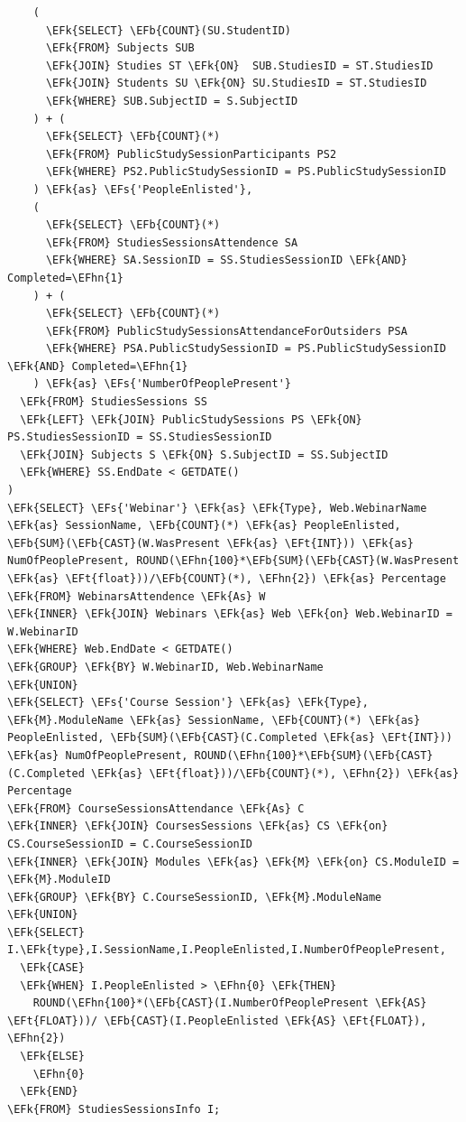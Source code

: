 \documentclass[11pt]{article}
\newcommand{\EFs}[1]{\textcolor{EFs}{#1}} %
\newcommand{\EFk}[1]{\textcolor{EFk}{\textbf{#1}}} %
\newcommand{\EFb}[1]{\textcolor{EFb}{\textbf{#1}}} %
\newcommand{\EFt}[1]{\textcolor{EFt}{\textbf{#1}}} %
\newcommand{\EFhn}[1]{\textcolor{EFhn}{#1}} %
\begin{document}
\begin{Code}
\begin{Verbatim}
    (
      \EFk{SELECT} \EFb{COUNT}(SU.StudentID)
      \EFk{FROM} Subjects SUB
      \EFk{JOIN} Studies ST \EFk{ON}  SUB.StudiesID = ST.StudiesID
      \EFk{JOIN} Students SU \EFk{ON} SU.StudiesID = ST.StudiesID
      \EFk{WHERE} SUB.SubjectID = S.SubjectID
    ) + (
      \EFk{SELECT} \EFb{COUNT}(*)
      \EFk{FROM} PublicStudySessionParticipants PS2
      \EFk{WHERE} PS2.PublicStudySessionID = PS.PublicStudySessionID
    ) \EFk{as} \EFs{'PeopleEnlisted'}, 
    (
      \EFk{SELECT} \EFb{COUNT}(*)
      \EFk{FROM} StudiesSessionsAttendence SA
      \EFk{WHERE} SA.SessionID = SS.StudiesSessionID \EFk{AND} Completed=\EFhn{1}
    ) + (
      \EFk{SELECT} \EFb{COUNT}(*)
      \EFk{FROM} PublicStudySessionsAttendanceForOutsiders PSA
      \EFk{WHERE} PSA.PublicStudySessionID = PS.PublicStudySessionID \EFk{AND} Completed=\EFhn{1}
    ) \EFk{as} \EFs{'NumberOfPeoplePresent'}
  \EFk{FROM} StudiesSessions SS 
  \EFk{LEFT} \EFk{JOIN} PublicStudySessions PS \EFk{ON} PS.StudiesSessionID = SS.StudiesSessionID
  \EFk{JOIN} Subjects S \EFk{ON} S.SubjectID = SS.SubjectID
  \EFk{WHERE} SS.EndDate < GETDATE()
)
\EFk{SELECT} \EFs{'Webinar'} \EFk{as} \EFk{Type}, Web.WebinarName \EFk{as} SessionName, \EFb{COUNT}(*) \EFk{as} PeopleEnlisted, \EFb{SUM}(\EFb{CAST}(W.WasPresent \EFk{as} \EFt{INT})) \EFk{as} NumOfPeoplePresent, ROUND(\EFhn{100}*\EFb{SUM}(\EFb{CAST}(W.WasPresent \EFk{as} \EFt{float}))/\EFb{COUNT}(*), \EFhn{2}) \EFk{as} Percentage
\EFk{FROM} WebinarsAttendence \EFk{As} W
\EFk{INNER} \EFk{JOIN} Webinars \EFk{as} Web \EFk{on} Web.WebinarID = W.WebinarID
\EFk{WHERE} Web.EndDate < GETDATE()
\EFk{GROUP} \EFk{BY} W.WebinarID, Web.WebinarName
\EFk{UNION}
\EFk{SELECT} \EFs{'Course Session'} \EFk{as} \EFk{Type}, \EFk{M}.ModuleName \EFk{as} SessionName, \EFb{COUNT}(*) \EFk{as} PeopleEnlisted, \EFb{SUM}(\EFb{CAST}(C.Completed \EFk{as} \EFt{INT})) \EFk{as} NumOfPeoplePresent, ROUND(\EFhn{100}*\EFb{SUM}(\EFb{CAST}(C.Completed \EFk{as} \EFt{float}))/\EFb{COUNT}(*), \EFhn{2}) \EFk{as} Percentage
\EFk{FROM} CourseSessionsAttendance \EFk{As} C
\EFk{INNER} \EFk{JOIN} CoursesSessions \EFk{as} CS \EFk{on} CS.CourseSessionID = C.CourseSessionID
\EFk{INNER} \EFk{JOIN} Modules \EFk{as} \EFk{M} \EFk{on} CS.ModuleID = \EFk{M}.ModuleID
\EFk{GROUP} \EFk{BY} C.CourseSessionID, \EFk{M}.ModuleName
\EFk{UNION}
\EFk{SELECT} I.\EFk{type},I.SessionName,I.PeopleEnlisted,I.NumberOfPeoplePresent,
  \EFk{CASE} 
  \EFk{WHEN} I.PeopleEnlisted > \EFhn{0} \EFk{THEN}
    ROUND(\EFhn{100}*(\EFb{CAST}(I.NumberOfPeoplePresent \EFk{AS} \EFt{FLOAT}))/ \EFb{CAST}(I.PeopleEnlisted \EFk{AS} \EFt{FLOAT}), \EFhn{2})
  \EFk{ELSE} 
    \EFhn{0}
  \EFk{END}
\EFk{FROM} StudiesSessionsInfo I;
\end{Verbatim}
\end{Code}
\end{document}
